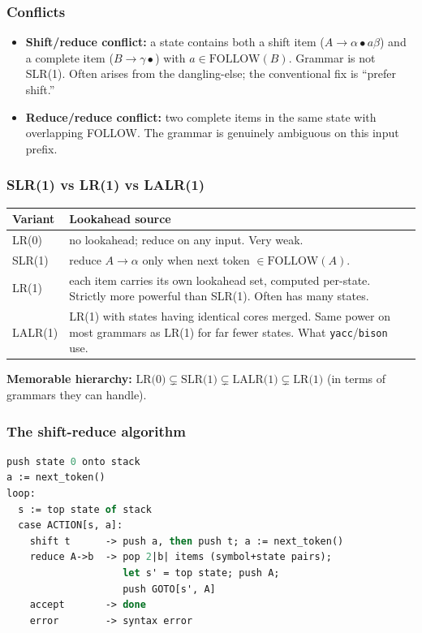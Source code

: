 \documentclass[11pt,a4paper]{article}
\begin{document}
\subsubsection*{Conflicts}

\begin{itemize}[leftmargin=*,itemsep=0pt]
  \item \textbf{Shift/reduce conflict:} a state contains both a shift item ($A \to \alpha \bullet a \beta$) and a complete item ($B \to \gamma \bullet$) with $a \in \text{FOLLOW}(B)$. Grammar is not SLR(1). Often arises from the dangling-else; the conventional fix is ``prefer shift.''
  \item \textbf{Reduce/reduce conflict:} two complete items in the same state with overlapping FOLLOW. The grammar is genuinely ambiguous on this input prefix.
\end{itemize}

\subsubsection*{SLR(1) vs LR(1) vs LALR(1)}

\begin{center}
\begin{tabular}{lp{10cm}}
\hline
\textbf{Variant} & \textbf{Lookahead source} \\
\hline
LR(0)    & no lookahead; reduce on any input. Very weak. \\
SLR(1)   & reduce $A \to \alpha$ only when next token $\in \text{FOLLOW}(A)$. \\
LR(1)    & each item carries its own lookahead set, computed per-state. Strictly more powerful than SLR(1). Often has many states. \\
LALR(1)  & LR(1) with states having identical cores merged. Same power on most grammars as LR(1) for far fewer states. What \texttt{yacc}/\texttt{bison} use. \\
\hline
\end{tabular}
\end{center}

\textbf{Memorable hierarchy:} $\text{LR(0)} \subsetneq \text{SLR(1)} \subsetneq \text{LALR(1)} \subsetneq \text{LR(1)}$ (in terms of grammars they can handle).

\subsubsection*{The shift-reduce algorithm}

\begin{lstlisting}[language=ocaml]
push state 0 onto stack
a := next_token()
loop:
  s := top state of stack
  case ACTION[s, a]:
    shift t      -> push a, then push t; a := next_token()
    reduce A->b  -> pop 2|b| items (symbol+state pairs);
                    let s' = top state; push A;
                    push GOTO[s', A]
    accept       -> done
    error        -> syntax error
\end{lstlisting}
\end{document}
